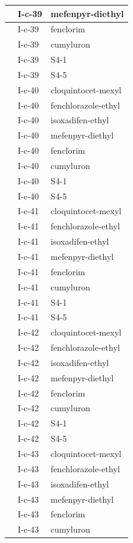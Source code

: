 \documentclass[11pt,a4paper]{article}
\begin{document}
\begin{table}[h]
\begin{tabular}{|l|l|l|}
 & I-c-39 & mefenpyr-diethyl \\ \hline
 & I-c-39 & fenclorim \\ \hline
 & I-c-39 & cumyluron \\ \hline
 & I-c-39 & S4-1 \\ \hline
 & I-c-39 & S4-5 \\ \hline
 & I-c-40 & cloquintocet-mexyl \\ \hline
 & I-c-40 & fenchlorazole-ethyl \\ \hline
 & I-c-40 & isoxadifen-ethyl \\ \hline
 & I-c-40 & mefenpyr-diethyl \\ \hline
 & I-c-40 & fenclorim \\ \hline
 & I-c-40 & cumyluron \\ \hline
 & I-c-40 & S4-1 \\ \hline
 & I-c-40 & S4-5 \\ \hline
 & I-c-41 & cloquintocet-mexyl \\ \hline
 & I-c-41 & fenchlorazole-ethyl \\ \hline
 & I-c-41 & isoxadifen-ethyl \\ \hline
 & I-c-41 & mefenpyr-diethyl \\ \hline
 & I-c-41 & fenclorim \\ \hline
 & I-c-41 & cumyluron \\ \hline
 & I-c-41 & S4-1 \\ \hline
 & I-c-41 & S4-5 \\ \hline
 & I-c-42 & cloquintocet-mexyl \\ \hline
 & I-c-42 & fenchlorazole-ethyl \\ \hline
 & I-c-42 & isoxadifen-ethyl \\ \hline
 & I-c-42 & mefenpyr-diethyl \\ \hline
 & I-c-42 & fenclorim \\ \hline
 & I-c-42 & cumyluron \\ \hline
 & I-c-42 & S4-1 \\ \hline
 & I-c-42 & S4-5 \\ \hline
 & I-c-43 & cloquintocet-mexyl \\ \hline
 & I-c-43 & fenchlorazole-ethyl \\ \hline
 & I-c-43 & isoxadifen-ethyl \\ \hline
 & I-c-43 & mefenpyr-diethyl \\ \hline
 & I-c-43 & fenclorim \\ \hline
 & I-c-43 & cumyluron \\ \hline

\end{tabular}
\end{table}
\end{document}
